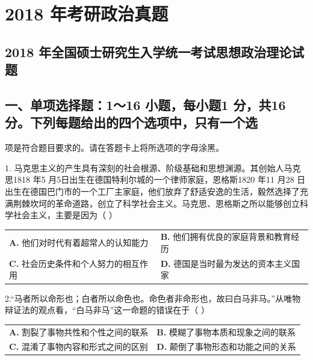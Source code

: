 \documentclass[UTF8,11pt]{ctexart}
\begin{document}
\section*{2018 年考研政治真题}
\subsection*{2018 年全国硕士研究生入学统一考试思想政治理论试题}

\subsection*{一、单项选择题：1～16 小题，每小题1 分，共16 分。下列每题给出的四个选项中，只有一个选}

项是符合题目要求的。请在答题卡上将所选项的字母涂黑。


1. 马克思主义的产生具有深刻的社会根源、阶级基础和思想渊源。其创始人马克思1818 年5 月5日出生在德国特利尔城的一个律师家庭，恩格斯1820 年11 月28 日出生在德国巴门市的一个工厂主家庭，他们放弃了舒适安逸的生活，毅然选择了充满荆棘坎坷的革命道路，创立了科学社会主义。马克思、恩格斯之所以能够创立科学社会主义，主要是因为（  ）


\begin{center}\begin{tabular}{>{\raggedright\arraybackslash}p{\dimexpr(\linewidth-4\tabcolsep)/2\relax}>{\raggedright\arraybackslash}p{\dimexpr(\linewidth-4\tabcolsep)/2\relax}}
\textbf{A.} 他们对时代有着超常人的认知能力 & \textbf{B.} 他们拥有优良的家庭背景和教育经历\\[.35em]
\textbf{C.} 社会历史条件和个人努力的相互作用 & \textbf{D.} 德国是当时最为发达的资本主义国家\\[.35em]\end{tabular}\end{center}

2.“马者所以命形也；白者所以命色也。命色者非命形也，故曰白马非马。”从唯物辩证法的观点看，“白马非马”这一命题的错误在于（  ）


\begin{center}\begin{tabular}{>{\raggedright\arraybackslash}p{\dimexpr(\linewidth-4\tabcolsep)/2\relax}>{\raggedright\arraybackslash}p{\dimexpr(\linewidth-4\tabcolsep)/2\relax}}
\textbf{A.} 割裂了事物共性和个性之间的联系 & \textbf{B.} 模糊了事物本质和现象之间的联系\\[.35em]
\textbf{C.} 混淆了事物内容和形式之间的区别 & \textbf{D.} 颠倒了事物形态和功能之间的关系\\[.35em]\end{tabular}\end{center}
\end{document}
